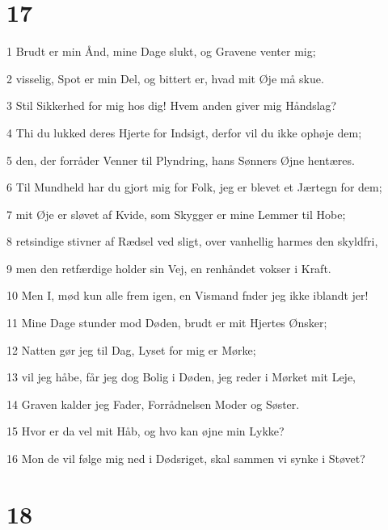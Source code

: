 \chapter{17}

\par 1 Brudt er min Ånd, mine Dage slukt, og Gravene venter mig;
\par 2 visselig, Spot er min Del, og bittert er, hvad mit Øje må skue.
\par 3 Stil Sikkerhed for mig hos dig! Hvem anden giver mig Håndslag?
\par 4 Thi du lukked deres Hjerte for Indsigt, derfor vil du ikke ophøje dem;
\par 5 den, der forråder Venner til Plyndring, hans Sønners Øjne hentæres.
\par 6 Til Mundheld har du gjort mig for Folk, jeg er blevet et Jærtegn for dem;
\par 7 mit Øje er sløvet af Kvide, som Skygger er mine Lemmer til Hobe;
\par 8 retsindige stivner af Rædsel ved sligt, over vanhellig harmes den skyldfri,
\par 9 men den retfærdige holder sin Vej, en renhåndet vokser i Kraft.
\par 10 Men I, mød kun alle frem igen, en Vismand fnder jeg ikke iblandt jer!
\par 11 Mine Dage stunder mod Døden, brudt er mit Hjertes Ønsker;
\par 12 Natten gør jeg til Dag, Lyset for mig er Mørke;
\par 13 vil jeg håbe, får jeg dog Bolig i Døden, jeg reder i Mørket mit Leje,
\par 14 Graven kalder jeg Fader, Forrådnelsen Moder og Søster.
\par 15 Hvor er da vel mit Håb, og hvo kan øjne min Lykke?
\par 16 Mon de vil følge mig ned i Dødsriget, skal sammen vi synke i Støvet?

\chapter{18}


